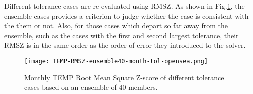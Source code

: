 Different tolerance cases are re-evaluated using RMSZ. 
As shown in Fig.\ref{fig:ssh_rmsz_t}, the ensemble cases provides a criterion to judge whether the case  is consistent with the them or not. Also, for those cases which depart so far away from the ensemble, such as the cases with the first and second largest tolerance, their RMSZ is in the same order as the order of error they introduced to the solver.  
\begin{figure}[!t]
\begin{center}
\texttt{[image: TEMP-RMSZ-ensemble40-month-tol-opensea.png]}

\end{center}
\vspace{-10pt}
\caption[] {Monthly TEMP Root Mean Square Z-score of different tolerance cases based on an ensemble of 40 members.}
\label{fig:ssh_rmsz_t}
\end{figure}

